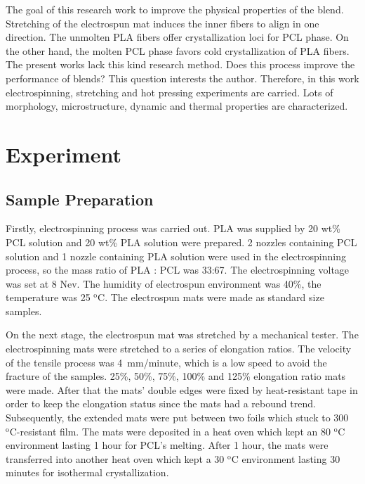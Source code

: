 \documentclass{Head}
\begin{document}
The goal of this research work to improve the physical properties of the blend. Stretching of the electrospun mat induces the inner fibers to align in one direction. The unmolten PLA fibers offer crystallization loci for PCL phase. On the other hand, the molten PCL phase favors cold crystallization of PLA fibers. The present works lack this kind research method. Does this process improve the performance of blends? This question interests the author. Therefore, in this work electrospinning, stretching and hot pressing experiments are carried. Lots of morphology, microstructure, dynamic and thermal properties are characterized.
\label{sec:introduction}

\section{Experiment}
\subsection{Sample Preparation} %
\label{sub:sample_preparation}
Firstly, electrospinning process was carried out. PLA was supplied by
20 wt\% PCL solution and 20 wt\% PLA solution were prepared. 2 nozzles containing PCL solution and 1 nozzle containing PLA solution were used in the electrospinning process, so the mass ratio of PLA : PCL was  33:67. The electrospinning voltage was set at 8 Nev. The humidity of electrospun environment was 40\%, the temperature was 25 $\mathrm{^o C}$. The electrospun mats were made as standard size samples.


On the next stage, the electrospun mat was stretched by a mechanical tester. The electrospinning mats were stretched to a series of elongation ratios. The velocity of the tensile process was 4 mm/minute, which is a low speed to avoid the fracture of the samples. 25\%, 50\%, 75\%, 100\% and 125\% elongation ratio mats were made. After that the mats' double edges were fixed by heat-resistant tape in order to keep the elongation status since the mats had a rebound trend. Subsequently, the extended mats were put between two foils which stuck to 300 $\mathrm{^o C}$-resistant film. The mats were deposited in a heat oven which kept an 80 $\mathrm{^o C}$ environment lasting 1 hour for PCL's melting. After 1 hour, the mats were transferred into another heat oven which kept a 30 $\mathrm{^o C}$ environment lasting 30 minutes for isothermal crystallization.
\end{document}

